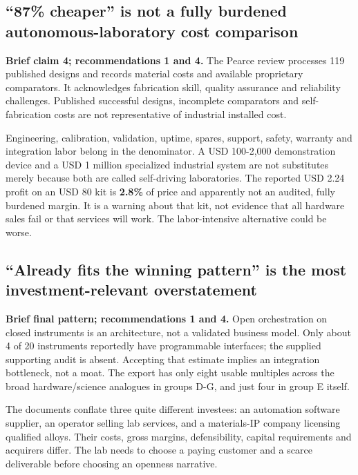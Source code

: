 \documentclass{article}
\begin{document}
\subsection{``87\% cheaper'' is not a fully burdened
autonomous-laboratory cost
comparison}\label{cheaper-is-not-a-fully-burdened-autonomous-laboratory-cost-comparison}

\textbf{Brief claim 4; recommendations 1 and 4.} The Pearce review
processes 119 published designs and records material costs and available
proprietary comparators. It acknowledges fabrication skill, quality
assurance and reliability challenges. \citep{Pearce2020} Published
successful designs, incomplete comparators and self-fabrication costs
are not representative of industrial installed cost.

Engineering, calibration, validation, uptime, spares, support, safety,
warranty and integration labor belong in the denominator. A USD
100-2,000 demonstration device and a USD 1 million specialized
industrial system are not substitutes merely because both are called
self-driving laboratories. The reported USD 2.24 profit on an USD 80 kit
is \textbf{2.8\%} of price and apparently not an audited, fully burdened
margin. It is a warning about that kit, not evidence that all hardware
sales fail or that services will work. The labor-intensive alternative
could be worse.

\subsection{``Already fits the winning pattern'' is the most
investment-relevant
overstatement}\label{already-fits-the-winning-pattern-is-the-most-investment-relevant-overstatement}

\textbf{Brief final pattern; recommendations 1 and 4.} Open
orchestration on closed instruments is an architecture, not a validated
business model. Only about 4 of 20 instruments reportedly have
programmable interfaces; the supplied supporting audit is absent.
Accepting that estimate implies an integration bottleneck, not a moat.
The export has only eight usable multiples across the broad
hardware/science analogues in groups D-G, and just four in group E
itself.

The documents conflate three quite different investees: an automation
software supplier, an operator selling lab services, and a materials-IP
company licensing qualified alloys. Their costs, gross margins,
defensibility, capital requirements and acquirers differ. The lab needs
to choose a paying customer and a scarce deliverable before choosing an
openness narrative.
\end{document}
